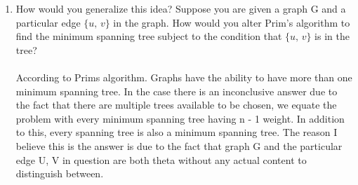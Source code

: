 \begin{enumerate}[label=(\alph*)]
\item How would you generalize this idea? Suppose you are given a graph G and a particular edge $\{u,\,v\}$ in the graph. How would you alter Prim's algorithm to find the minimum spanning tree subject to the condition that $\{u,\,v\}$ is in the tree?\\\\
According to Prims algorithm. Graphs have the ability to have more than one minimum spanning tree. In the case there is an inconclusive answer due to the fact that there are multiple trees available to be chosen, we equate the problem with every minimum spanning tree having n - 1 weight. In addition to this, every spanning tree is also a minimum spanning tree. The reason I believe this is the answer is due to the fact that graph G and the particular edge U, V in question are both theta without any actual content to distinguish between.

\\\\
\end{enumerate}




